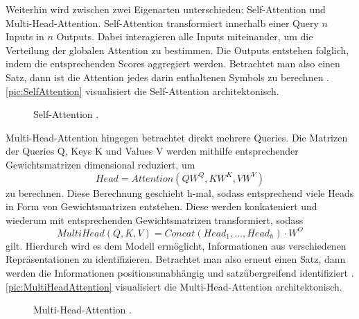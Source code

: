 \noindent
Weiterhin wird zwischen zwei Eigenarten unterschieden: Self-Attention und Multi-Head-Attention. Self-Attention transformiert innerhalb einer Query $n$ Inputs in $n$ Outputs. Dabei interagieren alle Inputs miteinander, um die Verteilung der globalen Attention zu bestimmen. Die Outputs entstehen folglich, indem die entsprechenden Scores aggregiert werden. Betrachtet man also einen Satz, dann ist die Attention jedes darin enthaltenen Symbols zu berechnen \cite{KAR19}. \autoref{pic:SelfAttention} visualisiert die Self-Attention architektonisch.

\begin{figure}[h!]
  \centering
  \caption{Self-Attention \cite[S.~400]{ZHA20}.}
  \label{pic:SelfAttention}
\end{figure}

\noindent
Multi-Head-Attention hingegen betrachtet direkt mehrere Queries. Die Matrizen der Queries Q, Keys K und Values V werden mithilfe entsprechender Gewichtsmatrizen dimensional reduziert, um $$Head = Attention(QW^Q, KW^K, VW^V)$$ zu berechnen. Diese Berechnung geschieht h-mal, sodass entsprechend viele Heads in Form von Gewichtsmatrizen entstehen. Diese werden konkateniert und wiederum mit entsprechenden Gewichtsmatrizen transformiert, sodass $$MultiHead(Q,K,V) = Concat(Head_1, ..., Head_h) \cdot W^O$$ gilt. Hierdurch wird es dem Modell ermöglicht, Informationen aus verschiedenen Repräsentationen zu identifizieren. Betrachtet man also erneut einen Satz, dann werden die Informationen positionsunabhängig und satzübergreifend identifiziert \cite{VAS17}. \autoref{pic:MultiHeadAttention} visualisiert die Multi-Head-Attention architektonisch.

\begin{figure}[h!]
  \centering
  \caption{Multi-Head-Attention \cite[S.~400]{ZHA20}.}
  \label{pic:MultiHeadAttention}
\end{figure}


